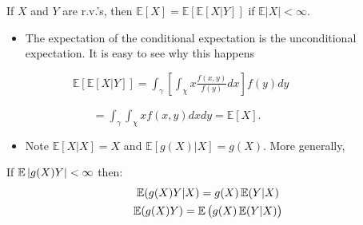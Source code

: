 \documentclass[notes=show]{beamer}
\begin{document}
\begin{frame}%


\begin{definition}
If $X$ and $Y$ are r.v.'s, then $\mathbb{E}[X]=\mathbb{E}[\mathbb{E}[X|Y]]$
if $\mathbb{E}\left\vert X\right\vert <\infty .$
\end{definition}

\begin{itemize}
\item The expectation of the conditional expectation is the unconditional
expectation. It is easy to see why this happens

$\qquad \ \ \ \ \ \ \ \ \ \ \mathbb{E}[\mathbb{E}[X|Y]]=\int_{\gamma }\left[
\int_{\chi }x\frac{f(x,y)}{f(y)}dx\right] f(y)dy$

$\qquad \qquad \qquad =\int_{\gamma }\int_{\chi }xf(x,y)dxdy=\mathbb{E}[X].$

\item Note $\mathbb{E}[X|X]=X$ and $\mathbb{E}[g\left( X\right) |X]=g\left(
X\right) .$ More generally,
\end{itemize}

\begin{theorem}
If $\mathop{\mathbb E \/}|g(X)Y|<\infty $ then: 
\begin{gather*}
\mathop{\mathbb E \/}(g(X)Y|X)=g(X)\mathop{\mathbb E \/}(Y|X) \\
\mathop{\mathbb E \/}(g(X)Y)=\mathop{\mathbb E \/}\big(g(X)\mathop{\mathbb E
\/}(Y|X)\big)
\end{gather*}
\end{theorem}

\end{frame}%
\end{document}
